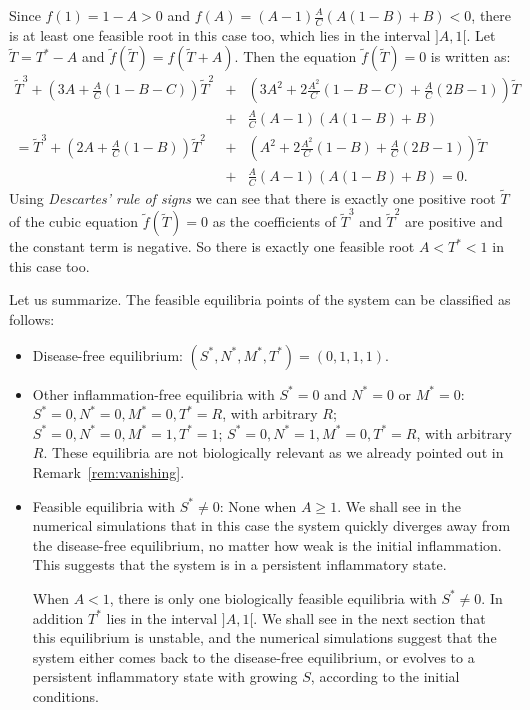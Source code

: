 \documentclass[a4paper, 12pt]{article}
\begin{document}
\begin{description}
Since $f(1)=1-A>0$ and $f(A)=(A-1)\frac{A}{C}(A(1-B)+B)<0$, there is at least one feasible root in this case too, which lies in the interval $]A,1[$.
Let $\tilde{T}=T^*-A$ and $\tilde{f}(\tilde{T})=f(\tilde{T}+A)$. Then the equation $\tilde{f}(\tilde{T})=0$ is written as:
\begin{eqnarray*}
\tilde{T}^3 +\left(3A+\frac{A}{C}(1-B-C)\right)\tilde{T}^2&+&\left(3A^2+2\frac{A^2}{C}(1-B-C)+\frac{A}{C}(2B-1)\right)\tilde{T}\\
&+&\frac{A}{C}(A-1)\left(A(1-B)+B\right)\\
    =\tilde{T}^3+\left(2A+\frac{A}{C}(1-B)\right)\tilde{T}^2&+&\left(A^2+2\frac{A^2}{C}(1-B)+\frac{A}{C}(2B-1)\right)\tilde{T}\\
    &+&\frac{A}{C}(A-1)\left(A(1-B)+B\right)=0.
    \end{eqnarray*}
    Using \textsl{Descartes' rule of signs} we can see that there is exactly one positive root $\tilde{T}$ 
    of the cubic equation $\tilde{f}(\tilde{T})=0$  as the coefficients of $\tilde{T}^3$ and $\tilde{T}^2$ are positive and the constant term is negative. 
    So there is exactly one feasible root $A<T^*<1$ in this case too.
\end{description}
\par\noindent Let us summarize. The feasible equilibria points of the system can be classified as follows:
\begin{itemize}
\item Disease-free equilibrium: $(S^*, N^*, M^*, T^*) = (0, 1, 1, 1)$.
\item Other inflammation-free equilibria with $S^* = 0$ and $N^* = 0$ or $M^* = 0$: 
$S^* = 0, N^* = 0, M^* = 0, T^* = R$, with arbitrary $R$;
 $S^* = 0, N^* = 0, M^* = 1, T^* = 1$;
 $S^* = 0, N^* = 1, M^* = 0, T^* = R$, with arbitrary $R$.
 These equilibria are not biologically relevant as we already pointed out in Remark~\ref{rem:vanishing}.
\item Feasible equilibria with $S^* \neq 0$: 
None when $A \geq 1$. We shall see in the numerical simulations that in this case the system quickly diverges away from the disease-free equilibrium, no matter how weak is the initial inflammation. 
This suggests that the system is in a persistent inflammatory state.

When $A < 1$, there is only one biologically feasible equilibria with $S^* \neq 0$. In addition $T^*$ lies in the interval $]A, 1[$.
 We shall see in the next section that this equilibrium is unstable,
  and the numerical simulations suggest that the system either comes back to the disease-free equilibrium, or evolves to a persistent inflammatory state with growing $S$, according to the initial conditions.
\end{itemize} 
%     
\end{document}
